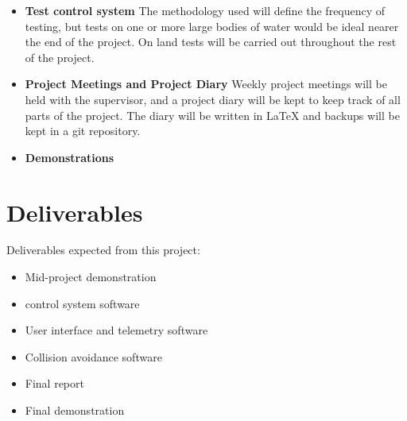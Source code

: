 \documentclass[titlepage 12pt]{article}
\begin{document}
{\begin{itemize}
\item \textbf{Test control system} The methodology used will define the frequency of testing, but tests on one or more large bodies of water would be ideal nearer the end of the project. On land tests will be carried out throughout the rest of the project.
\item \textbf{Project Meetings and Project Diary} Weekly project meetings will be held with the supervisor, and a project diary will be kept to keep track of all parts of the project. The diary will be written in LaTeX and backups will be kept in a git repository.
\item \textbf{Demonstrations}
\end{itemize}




\section{Deliverables}  
Deliverables expected from this project: 
\begin{itemize}
	\item Mid-project demonstration
	\item control system software
	\item User interface and telemetry software
	\item Collision avoidance software
	\item Final report
	\item Final demonstration
\end{itemize}


    
\newpage
\raggedright
{}
\printbibliography[title={Annotated Bibliography}]
%


}
\end{document}
